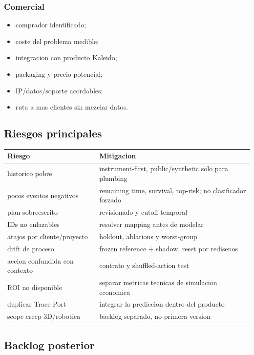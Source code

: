 \documentclass[
  spanish,
  10pt,
  a4paper,
]{article}
\newcounter{none} %
\providecommand{\tightlist}{%
  \setlength{\itemsep}{0pt}\setlength{\parskip}{0pt}}
\begin{document}
\subsubsection{Comercial}\label{comercial}

\begin{itemize}
\tightlist
\item
  comprador identificado;
\item
  coste del problema medible;
\item
  integracion con producto Kaleido;
\item
  packaging y precio potencial;
\item
  IP/datos/soporte acordables;
\item
  ruta a mas clientes sin mezclar datos.
\end{itemize}

\subsection{Riesgos principales}\label{riesgos-principales}

{\def\LTcaptype{none} %
\begin{longtable}[]{@{}ll@{}}
\toprule\noalign{}
Riesgo & Mitigacion \\
\midrule\noalign{}
\endhead
\bottomrule\noalign{}
\endlastfoot
historico pobre & instrument-first, public/synthetic solo para
plumbing \\
pocos eventos negativos & remaining time, survival, top-risk; no
clasificador forzado \\
plan sobreescrito & revisionado y cutoff temporal \\
IDs no enlazables & resolver mapping antes de modelar \\
atajos por cliente/proyecto & holdout, ablations y worst-group \\
drift de proceso & frozen reference + shadow, reset por redisenos \\
accion confundida con contexto & contrato y shuffled-action test \\
ROI no disponible & separar metricas tecnicas de simulacion economica \\
duplicar Trace Port & integrar la prediccion dentro del producto \\
scope creep 3D/robotica & backlog separado, no primera version \\
\end{longtable}
}

\subsection{Backlog posterior}\label{backlog-posterior}
\end{document}
